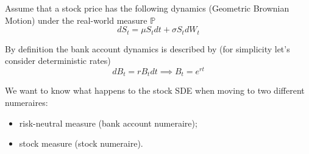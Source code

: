 \documentclass[12pt,a4paper]{book}
\begin{document}
\begin{question}[subtitle=Moving Away from $\mathbb{P}$ Measure]
Assume that a stock price has the following dynamics (Geometric Brownian Motion) under the real-world measure $\mathbb{P}$
\begin{equation*}
dS_t = \mu S_t dt + \sigma S_t dW_t
\end{equation*}

By definition the bank account dynamics is described by (for simplicity let's consider deterministic rates)
\begin{equation*}
dB_t = rB_tdt\implies B_t = e^{rt}
\end{equation*}

We want to know what happens to the stock SDE when moving to two different numeraires:
\begin{itemize}
\item risk-neutral measure (bank account numeraire);
\item stock measure (stock numeraire).
\end{itemize}
\end{question}
\end{document}
